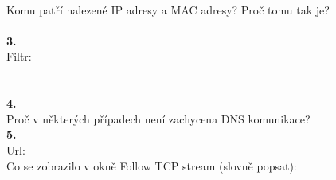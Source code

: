 \vspace{2em}
\\
Komu patří nalezené IP adresy a MAC adresy? Proč tomu tak je?
\\
\vspace{6em} \\
\textbf{3.}\\
Filtr:\\
\\
\vspace{2em} \\
\textbf{4.}\\
\vspace{4em}
Proč v některých případech není zachycena DNS komunikace?\\
\textbf{5.}\\
Url:\\
Co se zobrazilo v okně Follow TCP stream (slovně popsat):\\
